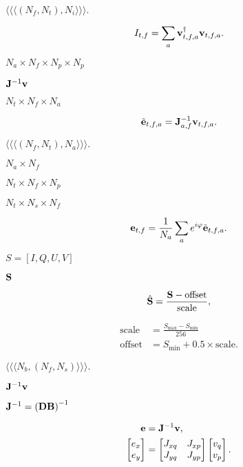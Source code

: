 \documentclass{article}
\begin{document}
$\langle\langle\langle(N_f, N_t), N_i\rangle\rangle\rangle.$
\pagebreak

\[ I_{t,f} = \sum_a {\bf v}_{t,f,a}^\dagger {\bf v}_{t,f,a}. \]
\pagebreak

$N_a \times N_f \times N_p \times N_p$
\pagebreak

${\bf J}^{-1}{\bf v}$
\pagebreak

$N_t \times N_f \times N_a$
\pagebreak

\[ \tilde{\bf e}_{t,f,a} = {\bf J}^{-1}_{a,f}{\bf v}_{t,f,a}. \]
\pagebreak

$\langle\langle\langle(N_f, N_t), N_a\rangle\rangle\rangle.$
\pagebreak

$N_a \times N_f$
\pagebreak

$N_t \times N_f \times N_p$
\pagebreak

$N_t \times N_s \times N_f$
\pagebreak

\[ {\bf e}_{t,f} = \frac{1}{N_a} \sum_a e^{i\varphi} \tilde{\bf e}_{t,f,a}. \]
\pagebreak

$S = [I, Q, U, V]$
\pagebreak

${\bf S}$
\pagebreak

\[ \hat{\bf S} = \frac{{\bf S} - \text{offset}}{\text{scale}}, \]
\pagebreak

\begin{align*} \text{scale} &= \frac{S_\text{max} - S_\text{min}}{256} \\ \text{offset} &= S_\text{min} + 0.5 \times \text{scale}. \end{align*}
\pagebreak

$\langle\langle\langle N_b,(N_f, N_s)\rangle\rangle\rangle.$
\pagebreak

${\bf J}^{-1} {\bf v}$
\pagebreak

${\bf J}^{-1} = \left({\bf D}{\bf B}\right)^{-1}$
\pagebreak

\[ \begin{aligned} {\bf e} &= {\bf J}^{-1} {\bf v}, \\ \begin{bmatrix} e_x \\ e_y \end{bmatrix} &= \begin{bmatrix} J_{xq} & J_{xp} \\ J_{yq} & J_{yp} \end{bmatrix} \begin{bmatrix} v_q \\ v_p \end{bmatrix}. \end{aligned} \]
\pagebreak
\end{document}
